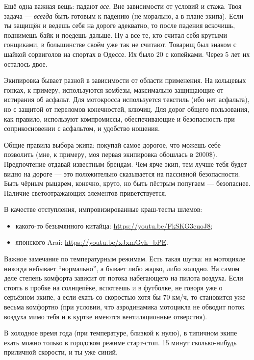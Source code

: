 \documentclass[12pt,a4paper]{article}
\begin{document}
Ещё одна важная вещь: падают \emph{все}. Вне зависимости от условий и
стажа. Твоя задача --- \emph{всегда} быть готовым к падению (не морально,
а в плане экипа). Если ты защищён и ведешь себя на дороге адекватно,
то после падения вскочишь, поднимешь байк и поедешь дальше. Ну а все
те, кто считал себя крутыми гонщиками, в большинстве своём уже так не
считают. Товарищ был знаком с шайкой сорвиголов на спортах в Одессе.
Их было 20 с копейками. Через 5 лет их осталось двое.

Экипировка бывает разной в зависимости от области применения. На
кольцевых гонках, к примеру, используются комбезы, максимально
защищающие от истирания об асфальт. Для мотокросса используется
текстиль (ибо нет асфальта), но с защитой от переломов конечностей,
ключиц. Для дорог общего пользования, как правило, используют
компромиссы, обеспечивающие и безопасность при соприкосновении с
асфальтом, и удобство ношения.

Общие правила выбора экипа: покупай самое дорогое, что можешь себе
позволить (мне, к примеру, моя первая экипировка обошлась в 2000\$).
Предпочтение отдавай известным брендам. Чем ярче экип, тем лучше тебя
будет видно на дороге --- это положительно сказывается на пассивной
безопасности. Быть чёрным рыцарем, конечно, круто, но быть пёстрым
попугаем --- безопаснее. Наличие светоотражающих элементов
приветствуется.

В качестве отступления, импровизированные краш-тесты шлемов:

\begin{itemize}
\item какого-то безымянного китайца:
\url{https://youtu.be/FkSKG3cuoJ8};
\item японского Arai:
\url{https://youtu.be/xJxmGvh_bPE}.
\end{itemize}

Важное замечание по температурным режимам. Есть такая шутка: на
мотоцикле никогда небывает ``нормально'', а бывает либо жарко, либо
холодно. На самом деле степень комфорта зависит от потока набегающего
на пилота воздуха. Если стоять в пробке на солнцепёке, вспотеешь и в
футболке, не говоря уже о серъёзном экипе, а если ехать со скоростью
хотя бы 70 км/ч, то становится уже весьма комфортно (при условии, что
аэродинамика мотоцикла не обводит поток воздуха мимо тебя и в куртке
имеются вентиляционные отверстия).

В холодное время года (при температуре, близкой к нулю), в типичном
экипе ехать можно только в городском режиме старт-стоп. 15 минут
сколько-нибудь приличной скорости, и ты уже синий.
\end{document}
